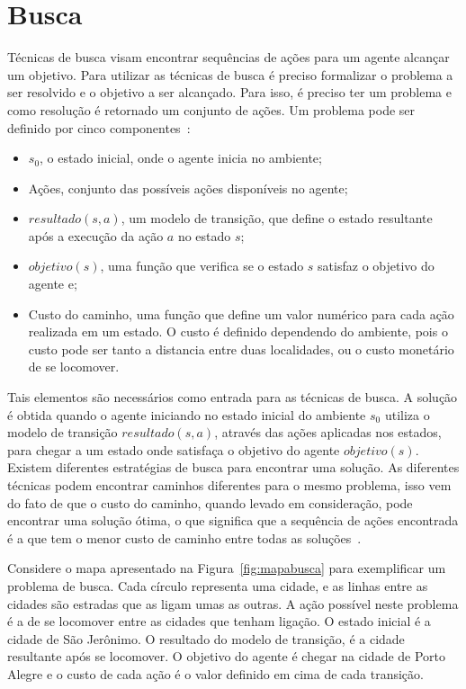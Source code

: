 \chapter{\label{chap:busca}Busca}

Técnicas de busca visam encontrar sequências de ações para um agente alcançar um objetivo.
Para utilizar as técnicas de busca é preciso formalizar o problema a ser resolvido e o objetivo a ser alcançado.
Para isso, é preciso ter um problema e como resolução é retornado um conjunto de ações.
Um problema pode ser definido por cinco componentes~\cite[Capítulo 3]{intelligence2003modern}: 

\begin{itemize}
	\item $s_{0}$, o estado inicial, onde o agente inicia no ambiente;
	\item Ações, conjunto das possíveis ações disponíveis no agente;
	\item $resultado(s, a)$, um modelo de transição, que define o estado resultante após a execução da ação $a$ no estado $s$;
	\item $objetivo(s)$, uma função que verifica se o estado $s$ satisfaz o objetivo do agente e; 
	\item Custo do caminho, uma função que define um valor numérico para cada ação realizada em um estado. O custo é definido dependendo do ambiente, pois o custo pode ser tanto a distancia entre duas localidades, ou o custo monetário de se locomover. 
\end{itemize}   

Tais elementos são necessários como entrada para as técnicas de busca.
A solução é obtida quando o agente iniciando no estado inicial do ambiente $s_{0}$ utiliza o modelo de transição $resultado(s, a)$, através das ações aplicadas nos estados, para chegar a um estado onde satisfaça o objetivo do agente $objetivo(s)$.
Existem diferentes estratégias de busca para encontrar uma solução.
As diferentes técnicas podem encontrar caminhos diferentes para o mesmo problema, isso vem do fato de que o custo do caminho, quando levado em consideração, pode encontrar uma solução ótima, o que significa que a sequência de ações encontrada é a que tem o menor custo de caminho entre todas as soluções~\cite[Capítulo 3]{intelligence2003modern}.

Considere o mapa apresentado na Figura~\ref{fig:mapabusca} para exemplificar um problema de busca.
Cada círculo representa uma cidade, e as linhas entre as cidades são estradas que as ligam umas as outras. 
A ação possível neste problema é a de se locomover entre as cidades que tenham ligação.
O estado inicial é a cidade de São Jerônimo. O resultado do modelo de transição, é a cidade resultante após se locomover. O objetivo do agente é chegar na cidade de Porto Alegre e o custo de cada ação é o valor definido em cima de cada transição. 

